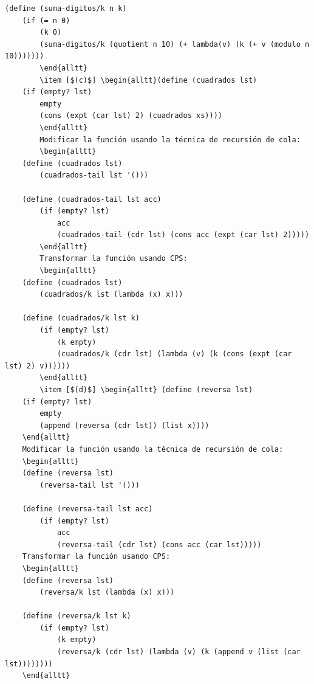 \documentclass[letterpaper,11pt]{article}
\begin{document}
\begin{enumerate}
\begin{itemize}
\begin{verbatim}
(define (suma-digitos/k n k)
    (if (= n 0)
        (k 0)
        (suma-digitos/k (quotient n 10) (+ lambda(v) (k (+ v (modulo n 10)))))))
        \end{alltt}
        \item [$(c)$] \begin{alltt}(define (cuadrados lst)
    (if (empty? lst)
        empty
        (cons (expt (car lst) 2) (cuadrados xs))))
        \end{alltt}
        Modificar la función usando la técnica de recursión de cola:
        \begin{alltt}
    (define (cuadrados lst)
        (cuadrados-tail lst '()))
        
    (define (cuadrados-tail lst acc)
        (if (empty? lst)
            acc
            (cuadrados-tail (cdr lst) (cons acc (expt (car lst) 2)))))
        \end{alltt}
        Transformar la función usando CPS:
        \begin{alltt}
    (define (cuadrados lst)
        (cuadrados/k lst (lambda (x) x)))
        
    (define (cuadrados/k lst k)
        (if (empty? lst)
            (k empty)
            (cuadrados/k (cdr lst) (lambda (v) (k (cons (expt (car lst) 2) v))))))
        \end{alltt}
        \item [$(d)$] \begin{alltt} (define (reversa lst)
    (if (empty? lst)
        empty
        (append (reversa (cdr lst)) (list x))))
    \end{alltt}
    Modificar la función usando la técnica de recursión de cola:
    \begin{alltt}
    (define (reversa lst)
        (reversa-tail lst '()))
        
    (define (reversa-tail lst acc)
        (if (empty? lst)
            acc
            (reversa-tail (cdr lst) (cons acc (car lst)))))
    Transformar la función usando CPS:
    \begin{alltt}
    (define (reversa lst)
        (reversa/k lst (lambda (x) x)))
        
    (define (reversa/k lst k)
        (if (empty? lst)
            (k empty)
            (reversa/k (cdr lst) (lambda (v) (k (append v (list (car lst))))))))
    \end{alltt}
    \end{verbatim}
    
    \end{itemize}
    

\end{enumerate}
\end{document}
